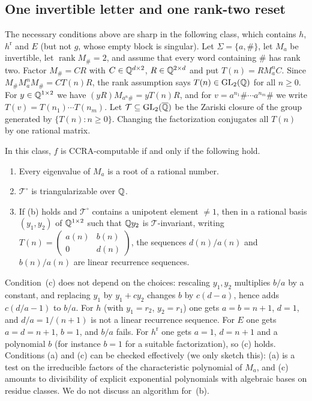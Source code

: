 \subsection{One invertible letter and one rank-two reset}
The necessary conditions above are sharp in the following class, which contains $h$, $h^{\mathrm r}$ and $E$ (but not $g$, whose empty block is singular). Let $\Sigma=\{a,\#\}$, let $M_a$ be invertible, let $\operatorname{rank}M_\#=2$, and assume that every word containing $\#$ has rank two. Factor $M_\#=CR$ with $C\in\mathbb{Q}^{d\times2}$, $R\in\mathbb{Q}^{2\times d}$ and put $T(n)=RM_a^nC$. Since $M_\#M_a^nM_\#=CT(n)R$, the rank assumption says $T(n)\in\mathrm{GL}_2(\mathbb{Q})$ for all $n\ge0$. For $y\in\mathbb{Q}^{1\times2}$ we have $(yR)M_{a^n\#}=yT(n)R$, and for $v=a^{n_1}\#\cdots a^{n_m}\#$ we write $T(v)=T(n_1)\cdots T(n_m)$. Let $\mathcal T\subseteq\mathrm{GL}_2(\overline{\mathbb{Q}})$ be the Zariski closure of the group generated by $\{T(n):n\ge0\}$. Changing the factorization conjugates all $T(n)$ by one rational matrix.

\begin{theorem}\label{thm:onereset}
In this class, $f$ is CCRA-computable if and only if the following hold.
\begin{enumerate}
\item[(a)] Every eigenvalue of $M_a$ is a root of a rational number.
\item[(b)] $\mathcal T^\circ$ is triangularizable over $\mathbb{Q}$.
\item[(c)] If (b) holds and $\mathcal T^\circ$ contains a unipotent element $\ne1$, then in a rational basis $(y_1,y_2)$ of $\mathbb{Q}^{1\times2}$ such that $\mathbb{Q} y_2$ is $\mathcal T$-invariant, writing $T(n)=\left(\begin{smallmatrix}a(n)&b(n)\\0&d(n)\end{smallmatrix}\right)$, the sequences $d(n)/a(n)$ and $b(n)/a(n)$ are linear recurrence sequences.
\end{enumerate}
\end{theorem}
Condition~(c) does not depend on the choices: rescaling $y_1,y_2$ multiplies $b/a$ by a constant, and replacing $y_1$ by $y_1+cy_2$ changes $b$ by $c(d-a)$, hence adds $c(d/a-1)$ to $b/a$.
For $h$ (with $y_1=r_2$, $y_2=r_1$) one gets $a=b=n+1$, $d=1$, and $d/a=1/(n+1)$ is not a linear recurrence sequence. For $E$ one gets $a=d=n+1$, $b=1$, and $b/a$ fails. For $h^{\mathrm r}$ one gets $a=1$, $d=n+1$ and a polynomial $b$ (for instance $b=1$ for a suitable factorization), so (c) holds. Conditions (a) and (c) can be checked effectively (we only sketch this): (a) is a test on the irreducible factors of the characteristic polynomial of $M_a$, and (c) amounts to divisibility of explicit exponential polynomials with algebraic bases on residue classes. We do not discuss an algorithm for~(b).

